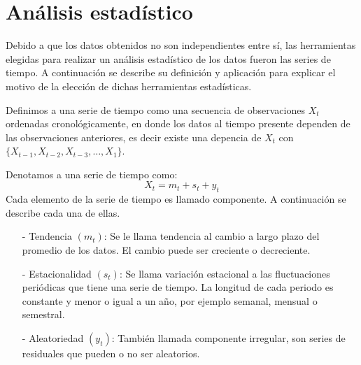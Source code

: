 \chapter{Análisis estadístico}




Debido a que los datos obtenidos no son independientes entre sí, las herramientas elegidas para realizar un análisis estadístico de los datos fueron las series de tiempo. A continuación se describe su definición y aplicación para explicar el motivo de la elección de dichas herramientas estadísticas.

Definimos a una serie de tiempo como una secuencia de observaciones $X_{t}$ ordenadas cronológicamente, en donde los datos al tiempo presente dependen de las observaciones anteriores, es decir existe una depencia de $X_{t}$ con $\{X_{t-1}, X_{t-2}, X_{t-3}, \ldots, X_{1}\}$.

Denotamos a una serie de tiempo como:
\begin{equation}
X_{t} = m_{t} + s_{t} + y_{t}
\end{equation}
Cada elemento de la serie de tiempo es llamado componente. A continuación se describe cada una de ellas.

\begin{itemize}
\item[-] Tendencia $(m_{t})$: Se le llama tendencia al cambio a largo plazo del promedio de los datos. El cambio puede ser creciente o decreciente.

\item[-] Estacionalidad $(s_{t})$: Se llama variación estacional a las fluctuaciones periódicas que tiene una serie de tiempo. La longitud de cada periodo es constante y menor o igual a un año, por ejemplo semanal, mensual o semestral.

\item[-] Aleatoriedad $(y_{t})$: También llamada componente irregular, son series de residuales que pueden o no ser aleatorios.
\end{itemize}

